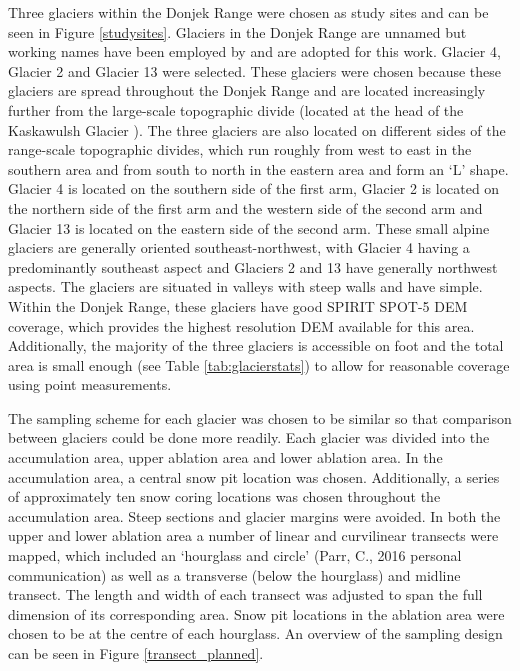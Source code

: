 \documentclass{sfuthesis}
\begin{document}
Three glaciers within the Donjek Range were chosen as study sites and can be seen in Figure \ref{studysites}. Glaciers in the Donjek Range are unnamed but working names have been employed by \cite{Crompton2016} and are adopted for this work. Glacier 4, Glacier 2 and Glacier 13 were selected. These glaciers were chosen because these glaciers are spread throughout the Donjek Range and are located increasingly further from the large-scale topographic divide (located at the head of the Kaskawulsh Glacier \citep{Taylor1969}). The three glaciers are also located on different sides of the range-scale topographic divides, which run roughly from west to east in the southern area and from south to north in the eastern area and form an `L' shape. Glacier 4 is located on the southern side of the first arm, Glacier 2 is located on the northern side of the first arm and the western side of the second arm and Glacier 13 is located on the eastern side of the second arm. These small alpine glaciers are generally oriented southeast-northwest, with Glacier 4 having a predominantly southeast aspect and Glaciers 2 and 13 have generally northwest aspects. The glaciers are situated in valleys with steep walls and have simple. Within the Donjek Range, these glaciers have good SPIRIT SPOT-5 DEM coverage, which provides the highest resolution DEM available for this area. Additionally, the majority of the three glaciers is accessible on foot and the total area is small enough (see Table \ref{tab:glacierstats}) to allow for reasonable coverage using point measurements.

The sampling scheme for each glacier was chosen to be similar so that comparison between glaciers could be done more readily. Each glacier was divided into the accumulation area, upper ablation area and lower ablation area. In the accumulation area, a central snow pit location was chosen. Additionally, a series of approximately ten snow coring locations was chosen throughout the accumulation area. Steep sections and glacier margins were avoided. In both the upper and lower ablation area a number of linear and curvilinear transects were mapped, which included an `hourglass and circle' (Parr, C., 2016 personal communication) as well as a transverse (below the hourglass) and midline transect. The length and width of each transect was adjusted to span the full dimension of its corresponding area. Snow pit locations in the ablation area were chosen to be at the centre of each hourglass. An overview of the sampling design can be seen in Figure \ref{transect_planned}.
\end{document}
